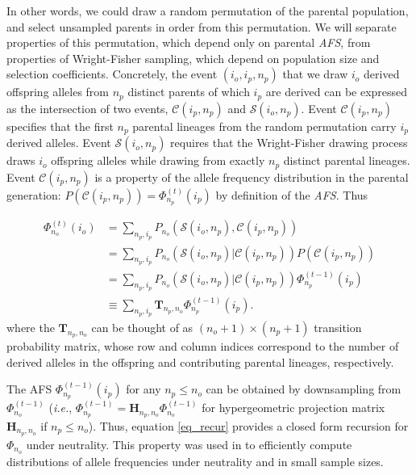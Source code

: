 \documentclass[review]{elsarticle}
\newcommand{\afs}[2]{\Phi_{#1}^{(#2)}}
\begin{document}
In other words, we could draw a random permutation of the parental population, and select unsampled parents
in order from this permutation. We will separate properties of this permutation, which depend only
on parental \textit{AFS}, from properties of Wright-Fisher sampling, which depend on population
size and selection coefficients.  Concretely, the event $(i_o, i_p,n_p)$ that we draw $i_o$ derived offspring 
alleles from $n_p$ distinct parents of which $i_p$ are derived can be expressed as the intersection of two events,
$\mathcal{C}(i_p,n_p)$ and $\mathcal{S}(i_o, n_p)$. Event $\mathcal{C}(i_p,n_p)$ specifies that the
first $n_p$ parental lineages from the random permutation carry $i_p$ derived alleles. Event
$\mathcal{S}(i_o, n_p)$ requires that the Wright-Fisher drawing process draws $i_o$ offspring alleles 
while drawing from exactly $n_p$ distinct parental lineages. Event $\mathcal{C}(i_p, n_p)$ is a property of the allele
frequency distribution in the parental generation: $P(\mathcal{C}(i_p,n_p)) =\afs{n_p}{t} (i_p)$
by definition of the \textit{AFS}. Thus 

\begin{equation}
  \begin{split}
    \afs{n_o}{t}(i_o)&= \sum_{n_p,i_p} P_{n_o}(\mathcal{S}(i_o, n_p), \mathcal{C}(i_p,n_p) )\\
    &=   \sum_{n_p,i_p} P_{n_o}(\mathcal{S}(i_o, n_p)| \mathcal{C}(i_p,n_p) ) P(\mathcal{C}(i_p,n_p))\\
    &=   \sum_{n_p,i_p} P_{n_o}(\mathcal{S}(i_o, n_p)| \mathcal{C}(i_p,n_p) )  \afs{n_p}{t-1}(i_p)\\
    &\equiv  \sum_{n_p,i_p}  \mathbf{T}_{n_p,n_o}     \afs{n_p}{t-1}(i_p).
  \end{split}
  \label{eq_recur}
\end{equation}
where the $\mathbf{T}_{n_p,n_o}$ can be thought of as $(n_o+1) \times (n_p+1)$ transition
probability matrix, whose row and column indices correspond to the number of derived alleles in the
offspring and contributing parental lineages, respectively.

The AFS  $\afs{n_p}{t-1}(i_p)$ for any  $n_p\leq n_o$ can be obtained by downsampling from $\afs{n_o}{t-1}$ (\textit{i.e.}, $\afs{n_p}{t-1} =
\mathbf{H}_{n_p,n_o} \afs{n_o}{t-1}$ for hypergeometric projection matrix $\mathbf{H}_{n_p,n_o}$ if
$n_p\leq n_o$). Thus, equation \eqref{eq_recur} provides a closed form recursion for $\Phi_{n_o}$ under neutrality.
This property was used in \cite{JouganousEtAl2017} to efficiently compute distributions of allele
frequencies under neutrality and in small sample sizes.
\end{document}
